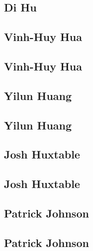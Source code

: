 \documentclass[twoside,14pt,a4paper,notitlepage]{memoir}
\begin{document}
\lipsum[1-2]
\subsection*{Di Hu}
\lipsum[3]



\subsection*{Vinh-Huy Hua}
\label{aut:hua}

\lipsum[1-2]
\subsection*{Vinh-Huy Hua}
\lipsum[3]



\subsection*{Yilun Huang}
\label{aut:huang}

\lipsum[1-2]
\subsection*{Yilun Huang}
\lipsum[3]



\subsection*{Josh Huxtable}
\label{aut:huxtable}

\lipsum[1-2]
\subsection*{Josh Huxtable}
\lipsum[3]



\subsection*{Patrick Johnson}
\label{aut:johnson}

\lipsum[1-2]
\subsection*{Patrick Johnson}
\lipsum[3]
\end{document}

